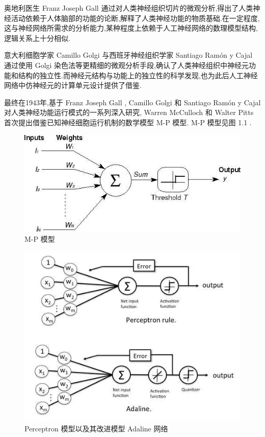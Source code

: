 奥地利医生 Franz Joseph Gall 通过对人类神经组织切片的微观分析,得出了人类神经活动依赖于人体脑部的功能的论断,解释了人类神经功能的物质基础.在一定程度,这与神经网络所需求的分析能力,某种程度上依赖于人工神经网络的数理模型结构,逻辑关系上十分相似.

意大利细胞学家 Camillo Golgi 与西班牙神经组织学家 Santiago Ramón y Cajal 通过使用 Golgi 染色法等更精细的微观分析手段,确认了人类神经组织中神经元功能和结构的独立性.而神经元结构与功能上的独立性的科学发现,也为此后人工神经网络中仿神经元的计算单元设计提供了借鉴.

最终在1943年,基于 Franz Joseph Gall , Camillo Golgi 和 Santiago Ramón y Cajal 对人类神经功能运行模式的一系列深入研究, Warren McCulloch 和 Walter Pitts 首次提出借鉴已知神经细胞运行机制的数学模型 M-P 模型. M-P 模型见图 1.1 .

\begin{figure}
	\centering
	\includegraphics[scale=0.7]{Figures/mpmodel.png}
	\caption{M-P 模型}
\end{figure}
\begin{figure}
	\centering
	\includegraphics[scale=0.7]{Figures/perceptron.png}
	\caption{Perceptron 模型以及其改进模型 Adaline 网络}
\end{figure}

